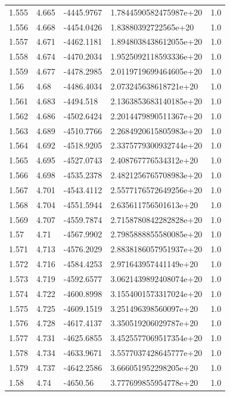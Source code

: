 \begin{tabular}{lllll}
1.555 & 4.665 & -4445.9767 & 1.7844590582475987e+20 & 1.0 \\
1.556 & 4.668 & -4454.0426 & 1.83880392722565e+20 & 1.0 \\
1.557 & 4.671 & -4462.1181 & 1.8948038438612055e+20 & 1.0 \\
1.558 & 4.674 & -4470.2034 & 1.9525092118593336e+20 & 1.0 \\
1.559 & 4.677 & -4478.2985 & 2.0119719699464605e+20 & 1.0 \\
1.56 & 4.68 & -4486.4034 & 2.073245638618721e+20 & 1.0 \\
1.561 & 4.683 & -4494.518 & 2.1363853683140185e+20 & 1.0 \\
1.562 & 4.686 & -4502.6424 & 2.2014479890511367e+20 & 1.0 \\
1.563 & 4.689 & -4510.7766 & 2.2684920615805983e+20 & 1.0 \\
1.564 & 4.692 & -4518.9205 & 2.3375779300932744e+20 & 1.0 \\
1.565 & 4.695 & -4527.0743 & 2.408767776534312e+20 & 1.0 \\
1.566 & 4.698 & -4535.2378 & 2.4821256765708983e+20 & 1.0 \\
1.567 & 4.701 & -4543.4112 & 2.5577176572649256e+20 & 1.0 \\
1.568 & 4.704 & -4551.5944 & 2.635611756501613e+20 & 1.0 \\
1.569 & 4.707 & -4559.7874 & 2.7158780842282828e+20 & 1.0 \\
1.57 & 4.71 & -4567.9902 & 2.7985888855580085e+20 & 1.0 \\
1.571 & 4.713 & -4576.2029 & 2.8838186057951937e+20 & 1.0 \\
1.572 & 4.716 & -4584.4253 & 2.971643957441149e+20 & 1.0 \\
1.573 & 4.719 & -4592.6577 & 3.0621439892408074e+20 & 1.0 \\
1.574 & 4.722 & -4600.8998 & 3.1554001573317024e+20 & 1.0 \\
1.575 & 4.725 & -4609.1519 & 3.251496398560097e+20 & 1.0 \\
1.576 & 4.728 & -4617.4137 & 3.350519206029787e+20 & 1.0 \\
1.577 & 4.731 & -4625.6855 & 3.4525577069517354e+20 & 1.0 \\
1.578 & 4.734 & -4633.9671 & 3.5577037428645777e+20 & 1.0 \\
1.579 & 4.737 & -4642.2586 & 3.666051952298205e+20 & 1.0 \\
1.58 & 4.74 & -4650.56 & 3.777699855954778e+20 & 1.0 \\

\end{tabular}
